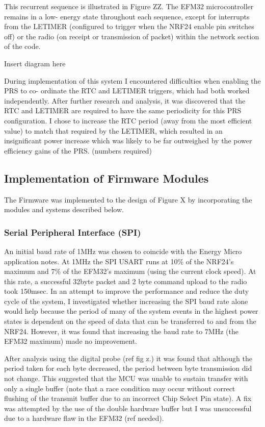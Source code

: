 This recurrent sequence is illustrated in Figure ZZ. The EFM32 microcontroller remains in a low-
energy state throughout each sequence, except for interrupts from the LETIMER (configured to
trigger when the NRF24 enable pin switches off) or the radio (on receipt or transmission of packet)
within the network section of the code.


Insert diagram here


During implementation of this system I encountered difficulties when enabling the PRS to co-
ordinate the RTC and LETIMER triggers, which had both worked independently. After further
research and analysis, it was discovered that the RTC and LETIMER are required to have the same
periodicity for this PRS configuration. I chose to increase the RTC period (away from the most
efficient value) to match that required by the LETIMER, which resulted in an insignificant power
increase which was likely to be far outweighed by the power efficiency gains of the PRS. (numbers
required)

\subsection{Implementation of Firmware Modules}
The Firmware was implemented to the design of Figure X by incorporating the modules and systems
described below.

\subsubsection{Serial Peripheral Interface (SPI)}
An initial baud rate of 1MHz was chosen to coincide with the Energy Micro application notes. At
1MHz the SPI USART runs at 10\% of the NRF24’s maximum and 7\% of the EFM32’s maximum (using
the current clock speed). At this rate, a successful 32byte packet and 2 byte command upload to the
radio took 150msec. In an attempt to improve the performance and reduce the duty cycle of the
system, I investigated whether increasing the SPI baud rate alone would help because the period of
many of the system events in the highest power states is dependent on the speed of data that can
be transferred to and from the NRF24. However, it was found that increasing the baud rate to 7MHz
(the EFM32 maximum) made no improvement.

After analysis using the digital probe (ref fig z.) it was found that although the period taken for each
byte decreased, the period between byte transmission did not change. This suggested that the MCU
was unable to sustain transfer with only a single buffer (note that a race condition may occur
without correct flushing of the transmit buffer due to an incorrect Chip Select Pin state). A fix was
attempted by the use of the double hardware buffer but I was unsuccessful due to a hardware flaw
in the EFM32 (ref needed).


